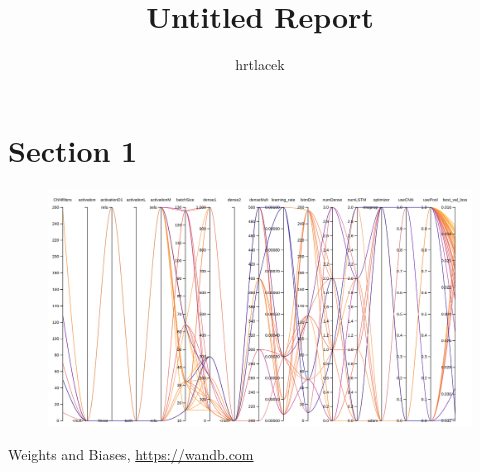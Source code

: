 \documentclass{article}
\title{Untitled Report}
\author{%
  hrtlacek
}
\begin{document}
\maketitle
\section{Section 1}
\begin{figure}[ht]
\includegraphics[width=0.5\linewidth]{charts/Section-1-Panel-0-epgzprslg}
\end{figure}
\begin{thebibliography}{9}
  Weights and Biases,
  \href{https://app.wandb.ai/hrtlacek/audioAI/reports/Untitled-Report--VmlldzoxNDEzMTY}{https://wandb.com}
\end{thebibliography}
\end{document}

